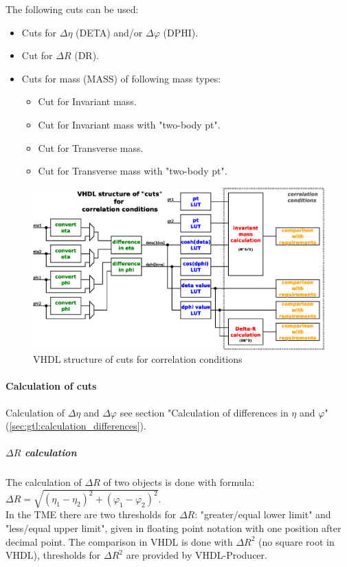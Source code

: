 The following cuts can be used:
\begin{itemize}
\item Cuts for $\Delta\eta$ (DETA) and/or $\Delta\varphi$ (DPHI).
\item Cut for $\Delta$$R$ (DR).
\item Cuts for mass (MASS) of following mass types:
  \begin{itemize}
  \item Cut for Invariant mass.
  \item Cut for Invariant mass with "two-body pt".
  \item Cut for Transverse mass.
  \item Cut for Transverse mass with "two-body pt".
  \end{itemize}
\end{itemize}

\begin{figure}[htb]
\centering
\includegraphics[width=15cm]{figures/scheme_vhdl_cuts_correllation_condition}
\caption{VHDL structure of cuts for correlation conditions} 
\label{fig:gtl:scheme_vhdl_cuts_correllation_condition}
\end{figure}

\paragraph{Calculation of cuts}
\label{sec:gtl:delta_r_calculation}

Calculation of $\Delta\eta$ and $\Delta\varphi$ see section "Calculation of differences in $\eta$ and $\varphi$" (\ref{sec:gtl:calculation_differences}).

\subparagraph{$\Delta$$R$ calculation}
\label{sec:gtl:delta_r_calculation}

The calculation of $\Delta$$R$ of two objects is done with formula:\\ $\Delta$$R=\sqrt{(\eta_1-\eta_2)^2+(\varphi_1-\varphi_2)^2}$.\\
In the TME there are two thresholds for $\Delta$$R$: "greater/equal lower limit" and "less/equal upper limit", given in floating point notation
with one position after decimal point.
The comparison in VHDL is done with $\Delta$$R^2$ (no square root in VHDL), thresholds for $\Delta$$R^2$ are provided by VHDL-Producer.

